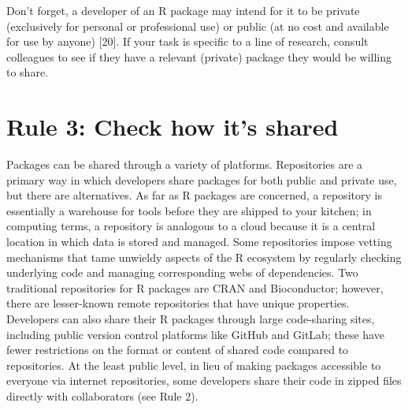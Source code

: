 \documentclass[10pt,letterpaper]{article}
\begin{document}
Don't forget, a developer of an R package may intend for it to be
private (exclusively for personal or professional use) or public (at no
cost and available for use by anyone) {[}20{]}. If your task is specific
to a line of research, consult colleagues to see if they have a relevant
(private) package they would be willing to share.

\hypertarget{rule-3-check-how-its-shared}{%
\section{Rule 3: Check how it's
shared}\label{rule-3-check-how-its-shared}}

Packages can be shared through a variety of platforms. Repositories are
a primary way in which developers share packages for both public and
private use, but there are alternatives. As far as R packages are
concerned, a repository is essentially a warehouse for tools before they
are shipped to your kitchen; in computing terms, a repository is
analogous to a cloud because it is a central location in which data is
stored and managed. Some repositories impose vetting mechanisms that
tame unwieldy aspects of the R ecosystem by regularly checking
underlying code and managing corresponding webs of dependencies. Two
traditional repositories for R packages are CRAN and Bioconductor;
however, there are lesser-known remote repositories that have unique
properties. Developers can also share their R packages through large
code-sharing sites, including public version control platforms like
GitHub and GitLab; these have fewer restrictions on the format or
content of shared code compared to repositories. At the least public
level, in lieu of making packages accessible to everyone via internet
repositories, some developers share their code in zipped files directly
with collaborators (see Rule 2).
\end{document}
